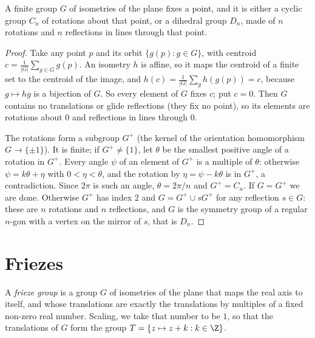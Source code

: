 \begin{theorem}\label{thm:leonardo}
A finite group $G$ of isometries of the plane fixes a point, and it is either a cyclic group $C_n$ of rotations about that point, or a
dihedral group $D_n$, made of $n$ rotations and $n$ reflections in lines through that point.
\end{theorem}
\begin{proof}
Take any point $p$ and its orbit $\{g(p):g\in G\}$, with centroid $c=\frac1{|G|}\sum_{g\in G}g(p)$. An isometry $h$ is affine, so it maps
the centroid of a finite set to the centroid of the image, and $h(c)=\frac1{|G|}\sum_gh(g(p))=c$, because $g\mapsto hg$ is a bijection of $G$.
So every element of $G$ fixes $c$; put $c=0$. Then $G$ contains no translations or glide reflections (they fix no point), so its elements
are rotations about $0$ and reflections in lines through $0$.

The rotations form a subgroup $G^+$ (the kernel of the orientation homomorphism $G\to\{\pm1\}$). It is finite; if $G^+\ne\{1\}$, let $\theta$
be the smallest positive angle of a rotation in $G^+$. Every angle $\psi$ of an element of $G^+$ is a multiple of $\theta$: otherwise
$\psi=k\theta+\eta$ with $0<\eta<\theta$, and the rotation by $\eta=\psi-k\theta$ is in $G^+$, a contradiction. Since $2\pi$ is such an
angle, $\theta=2\pi/n$ and $G^+=C_n$. If $G=G^+$ we are done. Otherwise $G^+$ has index $2$ and $G=G^+\cup sG^+$ for any reflection
$s\in G$: these are $n$ rotations and $n$ reflections, and $G$ is the symmetry group of a regular $n$-gon with a vertex on the mirror of $s$,
that is $D_n$.
\end{proof}

\section{Friezes}

\begin{definition}\label{def:frieze}
A \emph{frieze group} is a group $G$ of isometries of the plane that maps the real axis to itself, and whose translations are exactly the
translations by multiples of a fixed non-zero real number. Scaling, we take that number to be $1$, so that the translations of $G$ form
the group $T=\{z\mapsto z+k:k\in\Z\}$.
\end{definition}

